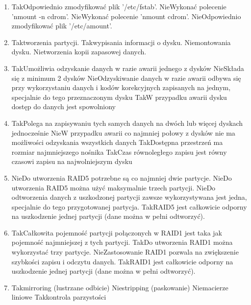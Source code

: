 \begin{enumerate}
	\newpage
	\item {}%
	{Tak}{Odpowiednio zmodyfikować plik '/etc/fstab'.}%
	{Nie}{Wykonać polecenie 'nmount -n cdrom'.}%
	{Nie}{Wykonać polecenie 'nmount cdrom'.}%
	{Nie}{Odpowiednio zmodyfikować plik '/etc/amount'.}
	\item {}%
	{Tak}{tworzenia partycji.}%
	{Tak}{wypisania informacji o dysku.}%
	{Nie}{montowania dysku.}%
	{Nie}{tworzenia kopii zapasowej danych.}
	\item {}%
	{Tak}{Umożliwia odzyskanie danych w razie awarii jednego z dysków}%
	{Nie}{Składa się z minimum 2 dysków}%
	{Nie}{Odzyskiwanie danych w razie awarii odbywa się przy wykorzystaniu danych i kodów korekcyjnych zapisanych na jednym, specjalnie do tego przeznaczonym dysku}%
	{Tak}{W przypadku awarii dysku dostęp do danych jest spowolniony}
	\item {}%
	{Tak}{Polega na zapisywaniu tych samych danych na dwóch lub więcej dyskach jednocześnie}%
	{Nie}{W przypadku awarii co najmniej połowy z dysków nie ma możliwości odzyskania wszystkich danych}%
	{Tak}{Dostępna przestrzeń ma rozmiar najmniejszego nośnika}%
	{Tak}{Czas równoległego zapisu jest równy czasowi zapisu na najwolniejszym dysku}
	\item {}%
	{Nie}{Do utworzenia RAID5 potrzebne są co najmniej dwie partycje.}%
	{Nie}{Do utworzenia RAID5 można użyć maksymalnie trzech partycji.}%
	{Nie}{Do odtworzenia danych z uszkodzonej partycji zawsze wykorzystywana jest jedna, specjalnie do tego przygotowanej partycja.}%
	{Tak}{RAID5 jest całkowicie odporny na uszkodzenie jednej partycji (dane można w pełni odtworzyć).}
	\item {}%
	{Tak}{Całkowita pojemność partycji połączonych w RAID1 jest taka jak pojemność najmniejszej z tych partycji.}%
	{Tak}{Do utworzenia RAID1 można wykorzystać trzy partycje.}%
	{Nie}{Zastosowanie RAID1 pozwala na zwiększenie szybkości zapisu i odczytu danych.}%
	{Tak}{RAID1 jest całkowicie odporny na uszkodzenie jednej partycji (dane można w pełni odtworzyć).}
	\item {}%
	{Tak}{mirroring (lustrzane odbicie)}%
	{Nie}{stripping (paskowanie)}%
	{Nie}{macierze liniowe}%
	{Tak}{kontrola parzystości}
	

\end{enumerate}

